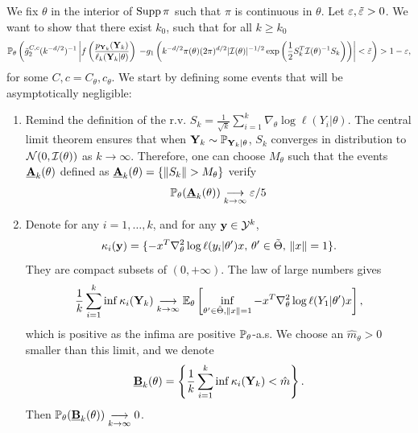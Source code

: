 \begin{proofb}
    We fix $\theta$ in the interior of $\operatorname{Supp}\pi$ such that $\pi$ is continuous in $\theta$. Let $\varepsilon,\tilde{\varepsilon}>0$. We want to show that there exist $k_0$, such that for all $k\geq k_0$
        \begin{equation}
            \mathbb{P}_\theta\left(\tilde g_2^{C,c}(k^{-d/2})^{-1}\left| f\left(\frac{p_{\mathbf{Y}_k}(\mathbf{Y}_k)}{\ell_k(\mathbf{Y}_k|\theta)}\right) \right.            \left. - g_1\left(k^{-d/2}\pi(\theta)(2\pi)^{d/2}|\mathcal{I}(\theta)|^{-1/2}\exp\left(\frac{1}{2}S_k^T\mathcal{I}(\theta)^{-1}S_k \right)\right) \right|<\tilde{\varepsilon}   \right)>1-\varepsilon,
        \end{equation}
    for some $C,c = C_\theta,c_\theta$.
    We start by defining some events that 
    will be asymptotically negligible:
    \begin{enumerate}
    \item Remind the definition of the r.v. $S_k=\frac{1}{\sqrt{k}}\sum_{i=1}^k\nabla_\theta\log\ell(Y_i|\theta)$. The central limit theorem ensures that when $\mathbf{Y}_k\sim\mathbb{P}_{\mathbf{Y}_k|\theta}$, $S_k$ converges in distribution to $\mathcal{N}(0,\mathcal{I}(\theta))$ as $k\to\infty$. Therefore, one can choose $M_\theta$ such that the events $ \underline{\mathbf{A}}_k(\theta)$ defined as $ \underline{\mbf A}_k(\theta)=\{\|S_k\|>M_\theta\}$ verify
        \begin{equation}
            \mathbb{P}_\theta( \underline{\mathbf{A}}_k(\theta))\overset{\ }{\underset{k\rightarrow\infty}{\longrightarrow}}\varepsilon/5
        \end{equation}
    
        \item Denote for any $i=1,\dots,k$, and for any $\mathbf{y} \in\mathcal{Y}^k$,
        \begin{equation}
            \kappa_i(\mathbf{y})=\{-x^T\nabla^2_\theta\log\ell(y_i|\theta')x,\,\theta'\in\tilde\Theta,\,\|x\|=1\}.
        \end{equation}
     They are compact subsets of $(0,+\infty)$. The law of large numbers gives 
     \begin{equation}
        \frac{1}{k}\sum_{i=1}^k\inf \kappa_i(\mathbf{Y}_k)\overset{\ }{\underset{k\rightarrow\infty}{\longrightarrow}}\mathbb{E}_\theta\left[\inf_{\theta'\in\tilde\Theta,\|x\|=1}-x^T\nabla^2_\theta\log\ell(Y_1|\theta')x\right]  ,
     \end{equation}
    which is positive as the infima are positive $\mathbb{P}_\theta$-a.s. We choose an $\hat m_\theta>0$ smaller than this limit, and we denote
        \begin{equation}
             \underline{\mathbf{B}}_k(\theta)=\left\{\frac{1}{k}\sum_{i=1}^k\inf \kappa_i(\mathbf{Y}_k)<\hat m\right\}.       
        \end{equation}
     Then $\mathbb{P}_\theta( \underline{\mathbf{B}}_k(\theta))\overset{\ }{\underset{k\rightarrow\infty}{\longrightarrow}}0$.


\end{enumerate}
\end{proofb}
